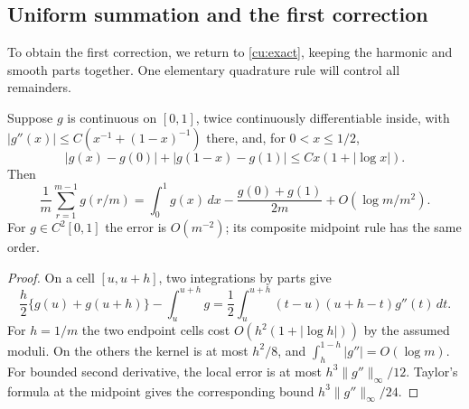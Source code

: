 \subsection{Uniform summation and the first correction}\label{sec:asym}
To obtain the first correction, we return to \eqref{cu:exact}, keeping
the harmonic and smooth parts together.
One elementary quadrature rule will control all remainders.

\begin{lemma}\label{cu:quadrature}
Suppose $g$ is continuous on $[0,1]$, twice continuously differentiable
inside, with $|g''(x)|\leq C(x^{-1}+(1-x)^{-1})$ there, and, for
$0<x\leq1/2$,
\[
 |g(x)-g(0)|+|g(1-x)-g(1)|\leq Cx(1+|\log x|).
\]
Then
\[
 \frac1m\sum_{r=1}^{m-1}g(r/m)=\int_0^1g(x)\,dx
       -\frac{g(0)+g(1)}{2m}+O(\log m/m^2).
\]
For $g\in C^2[0,1]$ the error is $O(m^{-2})$; its composite midpoint
rule has the same order.
\end{lemma}
\begin{proof}
On a cell $[u,u+h]$, two integrations by parts give
\[
 \frac h2\{g(u)+g(u+h)\}-\int_u^{u+h}g
 =\frac12\int_u^{u+h}(t-u)(u+h-t)g''(t)\,dt.
\]
For $h=1/m$ the two endpoint cells cost $O(h^2(1+|\log h|))$ by
the assumed moduli. On the others the kernel is at most $h^2/8$,
and $\int_h^{1-h}|g''|=O(\log m)$. For bounded second derivative,
the local error is at most $h^3\|g''\|_\infty/12$. Taylor's formula
at the midpoint gives the corresponding bound $h^3\|g''\|_\infty/24$.
\end{proof}

